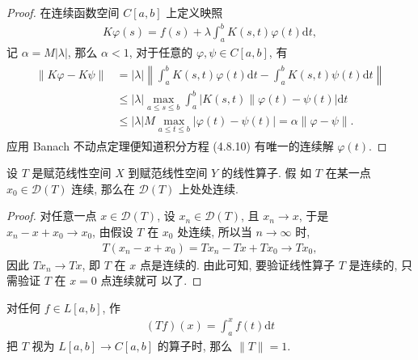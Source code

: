 \begin{proof}
在连续函数空间 $C[a, b]$ 上定义映照
\begin{align*}
K \varphi(s)=f(s)+\lambda \int_a^b K(s, t) \varphi(t) \mathrm{d} t,
\end{align*}
记 $\alpha=M|\lambda|$, 那么 $\alpha<1$, 对于任意的 $\varphi, \psi \in C[a, b]$, 有
\begin{align*}
\begin{aligned}
\|K \varphi-K \psi\| & =|\lambda|\left\|\int_a^b K(s, t) \varphi(t) \mathrm{d} t-\int_a^b K(s, t) \psi(t) \mathrm{d} t\right\| \\
& \leqslant|\lambda| \max _{a \leqslant s \leqslant b} \int_a^b|K(s, t) \| \varphi(t)-\psi(t)| \mathrm{d} t \\
& \leqslant|\lambda| M \max _{a \leqslant t \leqslant b}|\varphi(t)-\psi(t)|=\alpha\|\varphi-\psi\| .
\end{aligned}
\end{align*}
应用 Banach 不动点定理便知道积分方程 (4.8.10) 有唯一的连续解 $\varphi(t)$.
\end{proof}

\begin{example}
    设 $T$ 是赋范线性空间 $X$ 到赋范线性空间 $Y$ 的线性算子. 假 如 $T$ 在某一点 $x_0 \in \mathscr{D}(T)$ 连续, 那么在 $\mathscr{D}(T)$ 上处处连续.
\end{example}

\begin{proof}
    对任意一点 $x \in \mathscr{D}(T)$, 设 $x_n \in \mathscr{D}(T)$, 且 $x_n \rightarrow x$, 于是 $x_n-x+x_0 \rightarrow x_0$, 由假设 $T$ 在 $x_0$ 处连续, 所以当 $n \rightarrow \infty$ 时,
\begin{align*}
T\left(x_n-x+x_0\right)=T x_n-T x+T x_0 \rightarrow T x_0,
\end{align*}
因此 $T x_n \rightarrow T x$, 即 $T$ 在 $x$ 点是连续的.
由此可知, 要验证线性算子 $T$ 是连续的, 只需验证 $T$ 在 $x=0$ 点连续就可 以了.
\end{proof}
\clearpage
\begin{example}
对任何 $f \in L[a, b]$, 作
\begin{align*}
(T f)(x)=\int_a^x f(t) \mathrm{d} t
\end{align*}
把 $T$ 视为 $L[a, b] \rightarrow C[a, b]$ 的算子时, 那么 $\|T\|=1$.
\end{example}

